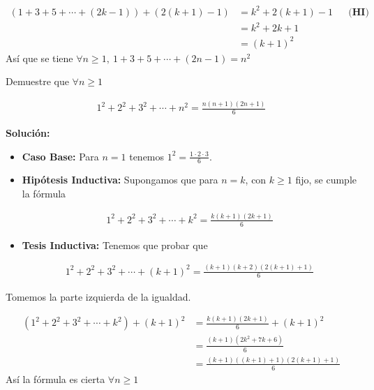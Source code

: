 \documentclass[12pt]{book}
\begin{document}
\begin{align*}
    ( 1+3+5+\cdots + (2k-1))+(2(k+1)-1)&=k^2+2(k+1)-1 &&\textbf{(HI)}\\
    &=k^2+2k+1 \\
    &=(k+1)^2
\end{align*}
Así que se tiene $\forall n \geq 1, \  1+3+5+\cdots + (2n-1)=n^2$
\begin{prob}{}{}
Demuestre que $\forall n \geq 1 $

\begin{align*}
    1^2+2^2+3^2+ \cdots +n^2=\frac{n(n+1)(2n+1)}{6}
\end{align*}
\end{prob}
\textbf{Solución:}
\begin{itemize}
    \item \textbf{Caso Base:} Para $n=1$ tenemos $1^2=\frac{1\cdot 2\cdot 3}{6}$.

    \item \textbf{Hipótesis Inductiva:} Supongamos que para $n=k$, con $k\geq 1$ fijo, se cumple la fórmula

    \begin{align*}
        1^2+2^2+3^2+ \cdots +k^2=\frac{k(k+1)(2k+1)}{6}
    \end{align*}

    \item \textbf{Tesis Inductiva:} Tenemos que probar que 

     \begin{align*}
        1^2+2^2+3^2+ \cdots +(k+1)^2=\frac{(k+1)(k+2)(2(k+1)+1)}{6}
    \end{align*}
\end{itemize}
Tomemos la parte izquierda de la igualdad. 

\begin{align*}
    (1^2+2^2+3^2+ \cdots +k^2)+(k+1)^2&=\frac{k(k+1)(2k+1)}{6}+ (k+1)^2 \\
    &=\frac{(k+1)(2k^2+7k+6)}{6} \\
    &=\frac{(k+1)((k+1)+1)(2(k+1)+1)}{6}
    \end{align*}
    Así la fórmula es cierta $\forall n \geq 1$
\end{document}
